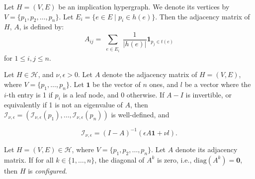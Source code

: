 \documentclass[10pt,a4paper]{amsart}
\begin{document}
\begin{definition}\label{def:prop_info}
Let \( H = (V, E) \) be an implication hypergraph. We denote its vertices by \( V = \{p_1,p_2,\ldots,p_n\} \). 
Let \( E_i = \{e \in E \mid p_i \in h(e)\} \). Then the adjacency matrix of \( H \), \( A \), is defined by:
\[
A_{ij} = \sum_{\substack{e \in E_i}} \frac{1}{|h(e)|} \mathbf{1}_{p_j \in t(e)}
\]
for \( 1 \leq i, j \leq n \).
\end{definition}

\begin{proposition}\label{prop:well-defined}
\normalfont
Let $H\in \mathcal{H}$, and $\nu, \epsilon>0$. Let $A$ denote the adjacency matrix of $H=(V,E)$, where $V=\{p_1,\ldots,p_n\}$. Let \( \mathbf{1} \) be the vector of $n$ ones, and \( l \) be a vector where the \( i \)-th entry is 1 if \( p_i \) is a leaf node, and 0 otherwise. If \( A - I \) is invertible, or equivalently if 1 is not an eigenvalue of \( A \), then \( \mathcal{I}_{\nu, \epsilon} = (\mathcal{I}_{\nu, \epsilon}(p_1), \ldots, \mathcal{I}_{\nu, \epsilon}(p_n)) \) is well-defined, and

\[
\mathcal{I}_{\nu, \epsilon} = (I - A)^{-1} \left( \epsilon A \mathbf{1} + \nu l \right).
\]
\end{proposition}

\begin{theorem}\label{thm:example2}
\normalfont
Let \( H=(V, E)\in \mathcal{H} \), where \( V = \{p_1, p_2, \ldots, p_n\} \). Let \( A \) denote its adjacency matrix. If for all \( k \in \{1, \ldots, n\} \), the diagonal of \( A^k \) is zero, i.e., \( \text{diag}(A^k) = \mathbf{0} \), then \( H \) is \emph{configured}.
\end{theorem}
\end{document}
